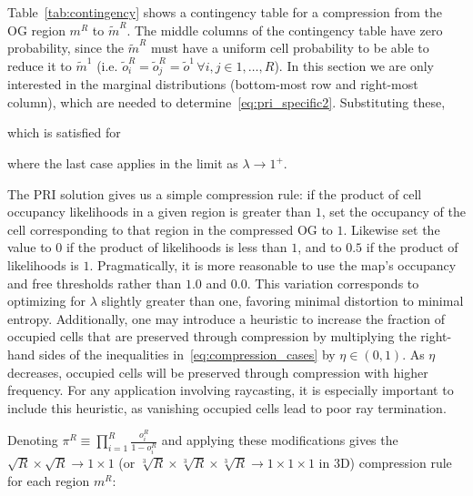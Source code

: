 Table~\ref{tab:contingency} shows a contingency table for a compression from the OG region $m^{R}$ to $\tilde{m}^{R}$. The middle columns of the contingency table have zero probability, since the $\tilde{m}^{R}$ must have a uniform cell probability to be able to reduce it to $\tilde{m}^{1}$ (i.e. $\tilde{o}^{R}_{i} = \tilde{o}^{R}_{j}=\tilde{o}^{1}\, \forall i,j \in 1,\dots,R$). In this section we are only interested in the marginal distributions (bottom-most row and right-most column), which are needed to determine~\eqref{eq:pri_specific2}. Substituting these,
%

which is satisfied for
%

where the last case applies in the limit as $\lambda \rightarrow 1^{+}$.

The PRI solution gives us a simple compression rule: if the product of cell occupancy likelihoods in a given region is greater than $1$, set the occupancy of the cell corresponding to that region in the compressed OG to $1$. Likewise set the value to $0$ if the product of likelihoods is less than $1$, and to $0.5$ if the product of likelihoods is $1$. Pragmatically, it is more reasonable to use the map's occupancy and free thresholds rather than $1.0$ and $0.0$. This variation corresponds to optimizing for $\lambda$ slightly greater than one, favoring minimal distortion to minimal entropy. Additionally, one may introduce a heuristic to increase the fraction of occupied cells that are preserved through compression by multiplying the right-hand sides of the inequalities in~\eqref{eq:compression_cases} by $\eta \in (0, 1)$. As $\eta$ decreases, occupied cells will be preserved through compression with higher frequency. For any application involving raycasting, it is especially important to include this heuristic, as vanishing occupied cells lead to poor ray termination.

Denoting $\pi^{R} \equiv \prod_{i=1}^{R}\frac{o_{i}^{R}}{1-o_{i}^{R}}$ and applying these modifications gives the $\sqrt{R}\times\sqrt{R}\rightarrow 1\times1$ (or $\sqrt[3]{R}\times\sqrt[3]{R}\times\sqrt[3]{R}\rightarrow 1\times1\times1$ in 3D) compression rule for each region $m^{R}$:
%

